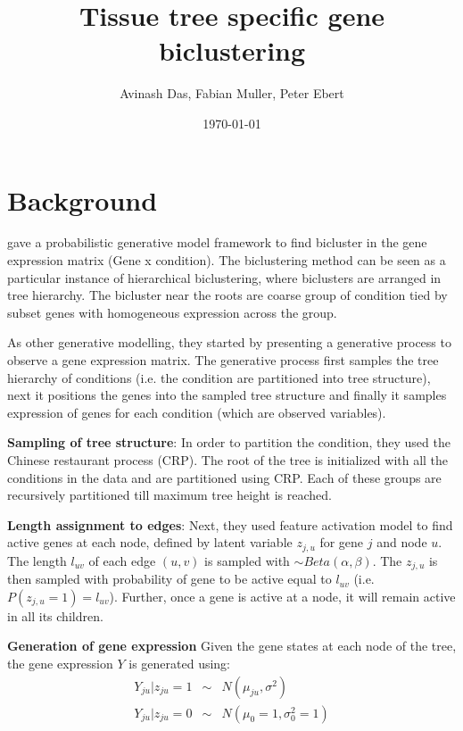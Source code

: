 \documentclass{article}
\title{
Tissue tree specific gene biclustering
}
\author{Avinash Das, Fabian Muller, Peter Ebert}
\date{\today}
\begin{document}
\pagestyle{fancy}

\maketitle
\section{Background}

\cite{Kaski2010} gave a probabilistic generative model framework to find bicluster in the gene expression 
matrix (Gene x condition). The biclustering method can be seen as a particular instance of hierarchical biclustering,
where biclusters
are arranged in tree hierarchy. The bicluster near the roots are coarse group of condition tied by subset genes
with homogeneous expression across the group. 

As other generative modelling, they started by presenting a generative process to 
observe a gene expression matrix. The generative process first samples the tree hierarchy 
of conditions (i.e. the condition are partitioned into tree structure), next 
it positions the genes into the sampled tree structure and finally it samples expression of genes
for each condition (which are observed variables). 

\par \textbf{Sampling of tree structure}:
In order to partition the condition, they used the Chinese restaurant process (CRP). The root of the tree
is initialized with all the conditions in the data and are partitioned using CRP. Each of these groups are 
recursively partitioned till maximum tree height is reached. 

\par \textbf{Length assignment to edges}:
Next, they used feature activation model to find active genes at each node, defined by latent variable $z_{j,u}$ for
gene $j$ and node $u$.
The length $l_{uv}$ of each edge $(u,v)$ is sampled with $ \sim Beta(\alpha,\beta)$. 
The $z_{j,u}$ 
is then sampled with probability of gene to be active equal to $l_{uv}$ (i.e. $P(z_{j,u} = 1) = l_{uv}$). 
Further, once a gene is active at a node, it will remain active in all its children.  


\par \textbf{Generation of gene expression}
Given the gene states at each node of the tree, the gene expression $Y$ is generated using:
\begin{eqnarray}
	Y_{ju}|z_{ju}=1  &\sim& N(\mu_{ju}, \sigma^2) \nonumber\\
	Y_{ju}|z_{ju}=0  &\sim& N(\mu_{0}=1, \sigma_0^2=1) 
	\label{eqn:Kexp}
\end{eqnarray}
\end{document}
